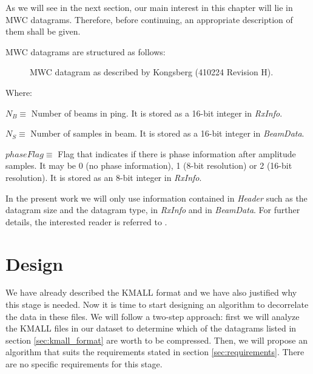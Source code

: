 As we will see in the next section, our main interest in this chapter will lie in MWC datagrams. Therefore, before continuing, an appropriate description of them shall be given.

\pagebreak
MWC datagrams are structured as follows:

\begin{figure}[h!]
	\begin{center}
		\scalebox{.565}{}
	\end{center}
	\caption{MWC datagram as described by Kongsberg (410224 Revision H).}
	\label{fig:mwc_datagram}
\end{figure}
Where:
\begin{description}
	\item $N_B \equiv$ Number of beams in ping. It is stored as a 16-bit integer in \textit{RxInfo}.
	\item $N_S \equiv$ Number of samples in beam. It is stored as a 16-bit integer in \textit{BeamData}.
	\item $phaseFlag \equiv$ Flag that indicates if there is phase information after amplitude samples. It may be 0 (no phase information), 1 (8-bit resolution) or 2 (16-bit resolution). It is stored as an 8-bit integer in \textit{RxInfo}.
\end{description}

In the present work we will only use information contained in \textit{Header} such as the datagram size and the datagram type, in \textit{RxInfo} and in \textit{BeamData}. For further details, the interested reader is referred to \parencite{KMALL}.

\section{Design}
We have already described the KMALL format and we have also justified why this stage is needed. Now it is time to start designing an algorithm to decorrelate the data in these files. We will follow a two-step approach: first we will analyze the KMALL files in our dataset to determine which of the datagrams listed in section \ref{sec:kmall_format} are worth to be compressed. Then, we will propose an algorithm that suits the requirements stated in section \ref{sec:requirements}. There are no specific requirements for this stage.

